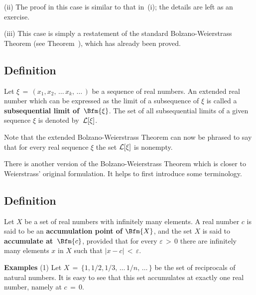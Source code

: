         (ii) The proof in this case is similar to that in~(i); the details are  left as an exercise. %

\V

        (iii) This case is simply a restatement of the standard Bolzano-Weierstrass Theorem (see Theorem~),
    which has already been proved.

\V


            \subsection{\small{\bf Definition}}
            \label{DefC30.15A}

\V

        Let ${\xi} \,=\, (x_{1}, x_{2},\,{\ldots}\,x_{k},\,{\ldots}\,)$ be a sequence of real numbers.
    An extended real number which can be expressed as the limit of a subsequence of ${\xi}$ is called a {\bf subsequential limit of~$\Bfm{{\xi}}$}.
    The set of all subsequential limits of a given sequence ${\xi}$ is denoted by~${\cal L}[{\xi}]$.

\V

        Note that the extended Bolzano-Weierstrass Theorem can now be phrased to say that for every real sequence ${\xi}$ the set ${\cal L}[{\xi}]$ is nonempty.

\VV


        There is another version of the Bolzano-Weierstrass Theorem which is closer to Weierstrass' original formulation.
    It helps to first introduce some terminology.

\V

            \subsection{\small{\bf Definition}}
            \label{DefC40.665}

\V

        Let $X$ be a set of real numbers with infinitely many elements. A real  number $c$ is said to be an {\bf accumulation point of $\Bfm{X}$},
    and the set $X$ is said to {\bf accumulate at~$\Bfm{c}$}, provided that for every ${\varepsilon}\,>\,0$
    there are infinitely many elements $x$ in $X$ such that $|x-c|\,<\,{\varepsilon}$.

\V

        {\bf Examples} (1) Let $X \,=\, \{1, 1/2, 1/3,\,{\ldots}\,1/n,\,{\ldots}\,\}$
    be the set of reciprocals of natural numbers. It is easy to see that this set accumulates at exactly one real number, namely at $c \,=\, 0$.

